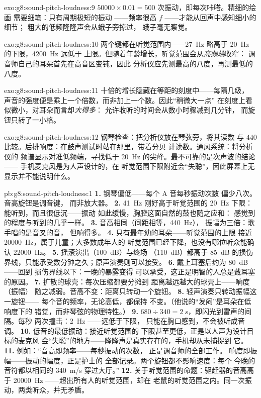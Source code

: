 \begin{solution}{exo:g8:sound-pitch-loudness:9}
$50000 \times 0.01 = 500$ 次振动，即每次咔嗒。精细的绘画
需要细笔：只有周期极短的振动
——频率很高 $f$ ——才能从回声中感知细小的细节；
粗大的低频隆隆声会从蛾子旁掠过，
蛾子毫无察觉。
\end{solution}

\begin{solution}{exo:g8:sound-pitch-loudness:10}
两个键都在听觉范围内——\qty{27}{Hz} 略高于
\qty{20}{Hz} 的下限，\qty{4200}{Hz} 远低于
上限。但随着年龄增长，听觉范围会从\emph{高频端}收窄：
调音师自己的耳朵首先在高音区变钝，因此
分析仪应先测最高的八度，再测最低的八度。
\end{solution}

\begin{solution}{exo:g8:sound-pitch-loudness:11}
十倍的增长隐藏在等距的刻度中——每隔几级，
声音的强度便是乘上一个倍数，而非加上一个数。因此“稍微大一点”
在刻度上看似微小，对耳朵而言却\emph{大得多}：
允许收听的时间会从数小时骤减到几分钟，
而旋钮只转了一小格。
\end{solution}

\begin{solution}{exo:g8:sound-pitch-loudness:12}
钢琴检查：把分析仪放在琴弦旁，将其读数
与 $440$ 比较。后排响度：在鼓声测试时站在那里，带着分贝
计读数。通风系统：将分析仪的
频谱显示对准低频端，寻找低于
\qty{20}{Hz} 的尖峰。最不可靠的是次声波的结论——
手机麦克风是为人声设计的，在
听觉范围下限附近会“失聪”，因此屏幕上无显示并不能说明什么。
\end{solution}

\begin{solution}{pb:g8:sound-pitch-loudness:1}
\textbf{1.} 钢琴偏低——每个 A 音每秒振动次数
偏少八次。音高旋钮是调音键，
而非放大器。
\textbf{2.} \qty{41}{Hz} 刚好高于听觉范围的
\qty{20}{Hz} 下限：能听到，而且很低沉——振动
如此缓慢，胸腔这面自然的鼓也随之应和：
感觉到的程度与听到的几乎一样。
\textbf{3.} 音高相同（间距相等，\qty{440}{Hz}），
振幅为三倍：歌手唱的是音叉的音，
但响得多。
\textbf{4.} 只有最年幼的耳朵——听觉范围的上限
接近 \qty{20000}{Hz}，属于儿童；大多数成年人的
听觉范围已经下降，也没有哪位听众能确认
\qty{22000}{Hz}。
\textbf{5.} 摇滚演出（\qty{100}{dB}）与终场
（\qty{110}{dB}）都高于 \qty{85}{dB} 的损伤
界线，只能承受数分钟之久；原声演奏则可以接受。
\textbf{6.} 戴上耳塞后约为 \qty{80}{dB}——回到
损伤界线以下：一晚的暴露变得
可以承受，这正是明智的人总是戴耳塞的原因。
\textbf{7.} 扩散的球壳：每次压缩都要分摊到
距离越远越大的球壳上——响度（振幅）
随之减弱。音高不变：距离只转动一个旋钮。
\textbf{8.} 轻声演奏只转动振幅这一旋钮——
每个音的频率，无论高低，都保持
不变。（他说的“发闷”是耳朵在低响度下的
错觉，而非琴弦的物理特性。）
\textbf{9.} $680 \div 340 = \qty{2}{s}$，即闪光到雷声的间隔。每秒
两次撞击：\qty{2}{Hz} ——远低于下限，
只能在胸口感到，不会被听成音调。
\textbf{10.} 低音的最低振动：接近听觉范围的
下限甚至更低，正是以人声为设计目标的麦克风
会“失聪”的地方——隆隆声是真实存在的，手机却从未捕捉到
它。
\textbf{11.} 例如：“音高即频率——每秒振动的次数，
正是调音师的全部工作。
响度即振幅——振动的幅度，正是护士的
全部记录。两个旋钮都不影响速度：每个
今晚的音符都以相同的 \qty{340}{m/s} 穿过大厅。”
\textbf{12.} 关于听觉范围的命题：驱赶器的音高高于
\qty{20000}{Hz} ——超出所有人的听觉范围，却在
老鼠的听觉范围之内。同一次振动，两类听众，并无矛盾。
\end{solution}
